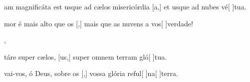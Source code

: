 {  {\item {}am magnificáta est usque ad cælos misericórdia [a,] et usque ad nubes vé[ ]{tu}a.~\Antiphona}%
    {\item {}mor é mais alto que os [,] mais que as nuvens a vos[ ]{ver}{da}de!~\Antiphona},
  {\item {}táre super cælos, [us,] super omnem terram gló[ ]{tu}a.~\Antiphona}%
    {\item {}vai-vos, ó Deus, sobre os [,] vossa glória reful[ ]{na}[ ]{ter}ra.~\Antiphona}
}